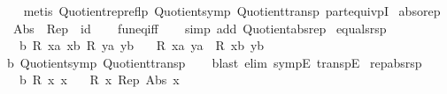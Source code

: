 \begin{isabellebody}
\ \ %
\endisadelimproof
%
\isatagproof
{}\isamarkupfalse%
\ {\isacharparenleft}{\kern0pt}metis\ Quotient{}{\isacharunderscore}{\kern0pt}rep{\isacharunderscore}{\kern0pt}reflp\ Quotient{}{\isacharunderscore}{\kern0pt}symp\ Quotient{}{\isacharunderscore}{\kern0pt}transp\ part{\isacharunderscore}{\kern0pt}equivpI{\isacharparenright}{\kern0pt}%
\endisatagproof
{\isafoldproof}%
%
\isadelimproof
\isanewline
%
\endisadelimproof
\isanewline
{}\isamarkupfalse%
\ abs{\isacharunderscore}{\kern0pt}o{\isacharunderscore}{\kern0pt}rep{\isacharcolon}{\kern0pt}\isanewline
\ \ {\isachardoublequoteopen}Abs\ {\isasymcirc}\ Rep\ {\isacharequal}{\kern0pt}\ id{\isachardoublequoteclose}\isanewline
%
\isadelimproof
\ \ %
\endisadelimproof
%
\isatagproof
{}\isamarkupfalse%
\ fun{\isacharunderscore}{\kern0pt}eq{\isacharunderscore}{\kern0pt}iff\isanewline
\ \ \isamarkupfalse%
\ {\isacharparenleft}{\kern0pt}simp\ add{\isacharcolon}{\kern0pt}\ Quotient{}{\isacharunderscore}{\kern0pt}abs{\isacharunderscore}{\kern0pt}rep{\isacharparenright}{\kern0pt}%
\endisatagproof
{\isafoldproof}%
%
\isadelimproof
\isanewline
%
\endisadelimproof
\isanewline
{}\isamarkupfalse%
\ equals{\isacharunderscore}{\kern0pt}rsp{\isacharcolon}{\kern0pt}\isanewline
\ \ \ b{\isacharcolon}{\kern0pt}\ {\isachardoublequoteopen}R\ xa\ xb{\isachardoublequoteclose}\ {\isachardoublequoteopen}R\ ya\ yb{\isachardoublequoteclose}\isanewline
\ \ \ {\isachardoublequoteopen}R\ xa\ ya\ {\isacharequal}{\kern0pt}\ R\ xb\ yb{\isachardoublequoteclose}\isanewline
%
\isadelimproof
\ \ %
\endisadelimproof
%
\isatagproof
{}\isamarkupfalse%
\ b\ Quotient{}{\isacharunderscore}{\kern0pt}symp\ Quotient{}{\isacharunderscore}{\kern0pt}transp\isanewline
\ \ \isamarkupfalse%
\ {\isacharparenleft}{\kern0pt}blast\ elim{\isacharcolon}{\kern0pt}\ sympE\ transpE{\isacharparenright}{\kern0pt}%
\endisatagproof
{\isafoldproof}%
%
\isadelimproof
\isanewline
%
\endisadelimproof
\isanewline
{}\isamarkupfalse%
\ rep{\isacharunderscore}{\kern0pt}abs{\isacharunderscore}{\kern0pt}rsp{\isacharcolon}{\kern0pt}\isanewline
\ \ \ b{\isacharcolon}{\kern0pt}\ {\isachardoublequoteopen}R\ x{}\ x{}{\isachardoublequoteclose}\isanewline
\ \ \ {\isachardoublequoteopen}R\ x{}\ {\isacharparenleft}{\kern0pt}Rep\ {\isacharparenleft}{\kern0pt}Abs\ x{}{\isacharparenright}{\kern0pt}{\isacharparenright}{\kern0pt}{\isachardoublequoteclose}\isanewline

\end{isabellebody}
